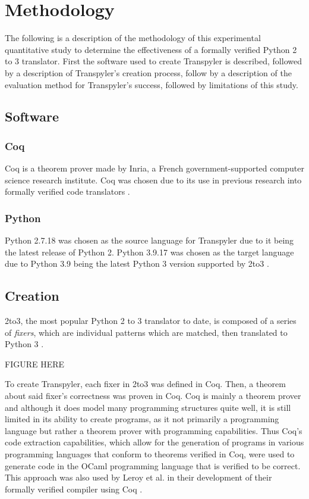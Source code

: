 \section{Methodology}
The following is a description of the methodology of this experimental quantitative study to determine the effectiveness of a formally verified Python 2 to 3 translator. First the software used to create Transpyler is described, followed by a description of Transpyler's creation process, follow by a description of the evaluation method for Transpyler's success, followed by limitations of this study.

\subsection{Software}
\subsubsection{Coq}
Coq is a theorem prover made by Inria, a French government-supported computer science research institute. Coq was chosen due to its use in previous research into formally verified code translators \autocite{Leroy}\autocite{Zhao}.
\subsubsection{Python}
Python 2.7.18 was chosen as the source language for Transpyler due to it being the latest release of Python 2. Python 3.9.17 was chosen as the target language due to Python 3.9 being the latest Python 3 version supported by 2to3 \autocite{2to3}.

\subsection{Creation}
2to3, the most popular Python 2 to 3 translator to date, is composed of a series of \textit{fixers}, which are individual patterns which are matched, then translated to Python 3 \autocite{2to3}.

FIGURE HERE

To create Transpyler, each fixer in 2to3 was defined in Coq. Then, a theorem about said fixer's correctness was proven in Coq. Coq is mainly a theorem prover and although it does model many programming structures quite well, it is still limited in its ability to create programs, as it not primarily a programming language but rather a theorem prover with programming capabilities. Thus Coq's code extraction capabilities, which allow for the generation of programs in various programming languages that conform to theorems verified in Coq, were used to generate code in the OCaml programming language that is verified to be correct. This approach was also used by Leroy et al. in their development of their formally verified compiler using Coq \autocite{Leroy}.


